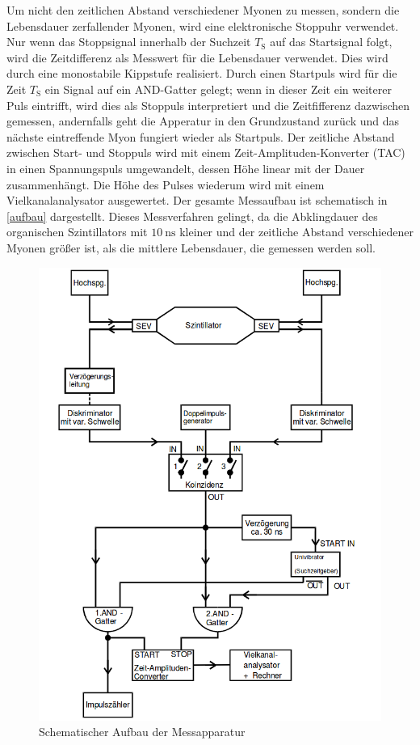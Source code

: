 Um nicht den zeitlichen Abstand verschiedener Myonen zu messen, sondern die Lebensdauer zerfallender Myonen, wird eine elektronische Stoppuhr verwendet. Nur wenn das Stoppsignal innerhalb der Suchzeit $T_\text{S}$ auf das Startsignal folgt, wird die Zeitdifferenz als Messwert für die Lebensdauer verwendet. Dies wird durch eine monostabile Kippstufe realisiert. Durch einen Startpuls wird für die Zeit $T_\text{S}$ ein Signal auf ein AND-Gatter gelegt; wenn in dieser Zeit ein weiterer Puls eintrifft, wird dies als Stoppuls interpretiert und die Zeitfifferenz dazwischen gemessen, andernfalls geht die Apperatur in den Grundzustand zurück und das nächste eintreffende Myon fungiert wieder als Startpuls. Der zeitliche Abstand zwischen Start- und Stoppuls wird mit einem Zeit-Amplituden-Konverter (TAC) in einen Spannungspuls umgewandelt, dessen Höhe linear mit der Dauer zusammenhängt. Die Höhe des Pulses wiederum wird mit einem Vielkanalanalysator ausgewertet. Der gesamte Messaufbau ist schematisch in \autoref{aufbau} dargestellt. Dieses Messverfahren gelingt, da die Abklingdauer des organischen Szintillators mit $\SI{10}{\nano\second}$ kleiner und der zeitliche Abstand verschiedener Myonen größer ist, als die mittlere Lebensdauer, die gemessen werden soll.
\begin{figure}
  \includegraphics[width=\textwidth]{img/aufbau.png}
  \caption{Schematischer Aufbau der Messapparatur \cite{FP}}
  \label{aufbau}
\end{figure}

